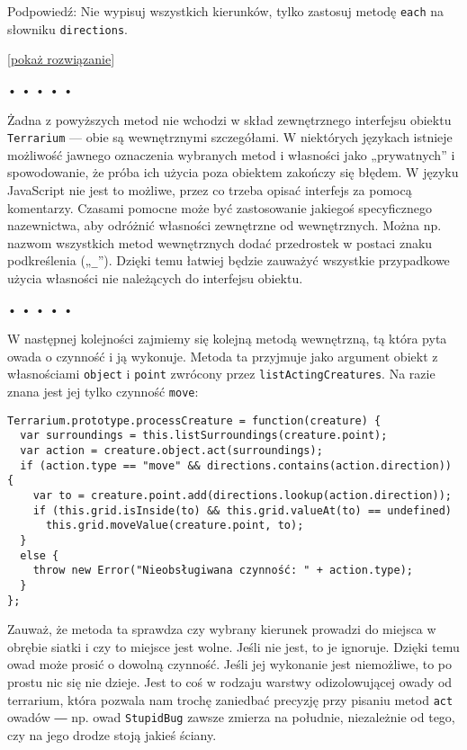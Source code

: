     
Podpowiedź: Nie wypisuj wszystkich kierunków, tylko zastosuj metodę \texttt{each} na słowniku \texttt{directions}.

  
[\hyperref[sol:8.5]{pokaż rozwiązanie}]
  


\begin{center}
• • • • •
\end{center}

  
Żadna z powyższych metod nie wchodzi w skład zewnętrznego interfejsu obiektu \texttt{Terrarium} — obie są wewnętrznymi szczegółami. W niektórych językach istnieje możliwość jawnego oznaczenia wybranych metod i własności jako „prywatnych” i spowodowanie, że próba ich użycia poza obiektem zakończy się błędem. W języku JavaScript nie jest to możliwe, przez co trzeba opisać interfejs za pomocą komentarzy. Czasami pomocne może być zastosowanie jakiegoś specyficznego nazewnictwa, aby odróżnić własności zewnętrzne od wewnętrznych. Można np. nazwom wszystkich metod wewnętrznych dodać przedrostek w postaci znaku podkreślenia („\texttt{\_}”). Dzięki temu łatwiej będzie zauważyć wszystkie przypadkowe użycia własności nie należących do interfejsu obiektu.



\begin{center}
• • • • •
\end{center}

  
W następnej kolejności zajmiemy się kolejną metodą wewnętrzną, tą która pyta owada o czynność i ją wykonuje. Metoda ta przyjmuje jako argument obiekt z własnościami \texttt{object} i \texttt{point} zwrócony przez \texttt{listActingCreatures}. Na razie znana jest jej tylko czynność \texttt{move}:

  
\begin{verbatim} 
Terrarium.prototype.processCreature = function(creature) {
  var surroundings = this.listSurroundings(creature.point);
  var action = creature.object.act(surroundings);
  if (action.type == "move" && directions.contains(action.direction)) {
    var to = creature.point.add(directions.lookup(action.direction));
    if (this.grid.isInside(to) && this.grid.valueAt(to) == undefined)
      this.grid.moveValue(creature.point, to);
  }
  else {
    throw new Error("Nieobsługiwana czynność: " + action.type);
  }
};
 \end{verbatim}
  
Zauważ, że metoda ta sprawdza czy wybrany kierunek prowadzi do miejsca w obrębie siatki i czy to miejsce jest wolne. Jeśli nie jest, to je ignoruje. Dzięki temu owad może prosić o dowolną czynność. Jeśli jej wykonanie jest niemożliwe, to po prostu nic się nie dzieje. Jest to coś w rodzaju warstwy odizolowującej owady od terrarium, która pozwala nam trochę zaniedbać precyzję przy pisaniu metod \texttt{act} owadów ― np. owad \texttt{StupidBug} zawsze zmierza na południe, niezależnie od tego, czy na jego drodze stoją jakieś ściany.



